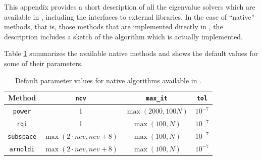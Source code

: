 	This appendix provides a short description of all the eigenvalue solvers which are available in \slepc, including the interfaces to external libraries. In the case of ``native'' methods, that is, those methods that are implemented directly in \slepc, the description includes a sketch of the algorithm which is actually implemented.

	Table \ref{tab:defaults} summarizes the available native methods and shows the default values for some of their parameters.
\begin{table}[ht]
\centering
\begin{tabular}{cccc} \hline
Method   & \texttt{ncv} & \texttt{max\_it} & \texttt{tol} \\ \hline
\texttt{power}    &  1 & $\max(2000,100N)$ & $10^{-7}$ \\ 
\texttt{rqi}      &  1 & $\max(100,N)$ & $10^{-7}$ \\ 
\texttt{subspace} &  $\max(2\cdot nev,nev+8)$ & $\max(100,N)$ & $10^{-7}$ \\ 
\texttt{arnoldi}  &  $\max(2\cdot nev,nev+8)$ & $\max(100,N)$ & $10^{-7}$ \\ 
\hline
\end{tabular}
\caption{\label{tab:defaults}Default parameter values for native algorithms available in \slepc.}
\end{table}


\section{}

